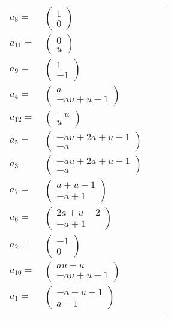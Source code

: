 \documentclass[1p]{elsarticle_modified}
\theoremstyle{definition}
\begin{document}
\begin{tabular}{m{7pt} m{180pt} m{7pt} m{180pt} }
\flushright $a_{8}=$&$\begin{pmatrix}1\\0\end{pmatrix}$ \\
\flushright $a_{11}=$&$\begin{pmatrix}0\\u\end{pmatrix}$ \\
\flushright $a_{9}=$&$\begin{pmatrix}1\\-1\end{pmatrix}$ \\
\flushright $a_{4}=$&$\begin{pmatrix}a\\- a u+u-1\end{pmatrix}$ \\
\flushright $a_{12}=$&$\begin{pmatrix}- u\\u\end{pmatrix}$ \\
\flushright $a_{5}=$&$\begin{pmatrix}- a u+2 a+u-1\\- a\end{pmatrix}$ \\
\flushright $a_{3}=$&$\begin{pmatrix}- a u+2 a+u-1\\- a\end{pmatrix}$ \\
\flushright $a_{7}=$&$\begin{pmatrix}a+u-1\\- a+1\end{pmatrix}$ \\
\flushright $a_{6}=$&$\begin{pmatrix}2 a+u-2\\- a+1\end{pmatrix}$ \\
\flushright $a_{2}=$&$\begin{pmatrix}-1\\0\end{pmatrix}$ \\
\flushright $a_{10}=$&$\begin{pmatrix}a u- u\\- a u+u-1\end{pmatrix}$ \\
\flushright $a_{1}=$&$\begin{pmatrix}- a- u+1\\a-1\end{pmatrix}$\\&\end{tabular}
\end{document}
